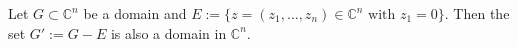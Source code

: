 Let $G \subset \mathbb{C}^n$ be a domain and $E := \{ z = (z_1, \ldots, z_n) \in \mathbb{C}^n \text{ with } z_1 = 0 \}$. Then the set $G' := G - E$ is also a domain in $\mathbb{C}^n$.
